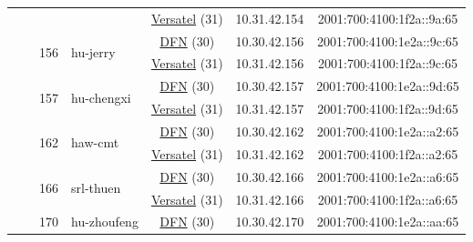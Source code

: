 \begin{small}
\begin{center}
\begin{longtable}{|c|c|c|c|c|c|c|c|}
  &  &  &  & \multicolumn{2}{|c|}{\tiny{\href{http://www.versatel.de}{Versatel} (31)}} & \tiny{10.31.42.154} & \tiny{2001:700:4100:1f2a::9a:65} \\* \cline{3-3}\cline{4-4}\cline{5-5}\cline{6-6}\cline{7-7}\cline{8-8}
  &  & \multirow{2}{*}{\tiny{156}} & \multicolumn{1}{|l|}{\multirow{2}{*}{\tiny{hu-jerry}}} & \multicolumn{2}{|c|}{\tiny{\href{https://www.dfn.de}{DFN} (30)}} & \tiny{10.30.42.156} & \tiny{2001:700:4100:1e2a::9c:65} \\* \cline{5-5}\cline{6-6}\cline{7-7}\cline{8-8}
  &  &  &  & \multicolumn{2}{|c|}{\tiny{\href{http://www.versatel.de}{Versatel} (31)}} & \tiny{10.31.42.156} & \tiny{2001:700:4100:1f2a::9c:65} \\* \cline{3-3}\cline{4-4}\cline{5-5}\cline{6-6}\cline{7-7}\cline{8-8}
  &  & \multirow{2}{*}{\tiny{157}} & \multicolumn{1}{|l|}{\multirow{2}{*}{\tiny{hu-chengxi}}} & \multicolumn{2}{|c|}{\tiny{\href{https://www.dfn.de}{DFN} (30)}} & \tiny{10.30.42.157} & \tiny{2001:700:4100:1e2a::9d:65} \\* \cline{5-5}\cline{6-6}\cline{7-7}\cline{8-8}
  &  &  &  & \multicolumn{2}{|c|}{\tiny{\href{http://www.versatel.de}{Versatel} (31)}} & \tiny{10.31.42.157} & \tiny{2001:700:4100:1f2a::9d:65} \\* \cline{3-3}\cline{4-4}\cline{5-5}\cline{6-6}\cline{7-7}\cline{8-8}
  &  & \multirow{2}{*}{\tiny{162}} & \multicolumn{1}{|l|}{\multirow{2}{*}{\tiny{haw-cmt}}} & \multicolumn{2}{|c|}{\tiny{\href{https://www.dfn.de}{DFN} (30)}} & \tiny{10.30.42.162} & \tiny{2001:700:4100:1e2a::a2:65} \\* \cline{5-5}\cline{6-6}\cline{7-7}\cline{8-8}
  &  &  &  & \multicolumn{2}{|c|}{\tiny{\href{http://www.versatel.de}{Versatel} (31)}} & \tiny{10.31.42.162} & \tiny{2001:700:4100:1f2a::a2:65} \\* \cline{3-3}\cline{4-4}\cline{5-5}\cline{6-6}\cline{7-7}\cline{8-8}
  &  & \multirow{2}{*}{\tiny{166}} & \multicolumn{1}{|l|}{\multirow{2}{*}{\tiny{srl-thuen}}} & \multicolumn{2}{|c|}{\tiny{\href{https://www.dfn.de}{DFN} (30)}} & \tiny{10.30.42.166} & \tiny{2001:700:4100:1e2a::a6:65} \\* \cline{5-5}\cline{6-6}\cline{7-7}\cline{8-8}
  &  &  &  & \multicolumn{2}{|c|}{\tiny{\href{http://www.versatel.de}{Versatel} (31)}} & \tiny{10.31.42.166} & \tiny{2001:700:4100:1f2a::a6:65} \\* \cline{3-3}\cline{4-4}\cline{5-5}\cline{6-6}\cline{7-7}\cline{8-8}
  &  & \multirow{2}{*}{\tiny{170}} & \multicolumn{1}{|l|}{\multirow{2}{*}{\tiny{hu-zhoufeng}}} & \multicolumn{2}{|c|}{\tiny{\href{https://www.dfn.de}{DFN} (30)}} & \tiny{10.30.42.170} & \tiny{2001:700:4100:1e2a::aa:65} \\* \cline{5-5}\cline{6-6}\cline{7-7}\cline{8-8}

\end{longtable}
\end{center}
\end{small}

